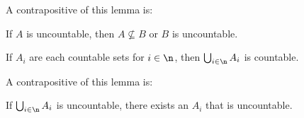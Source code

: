 \begin{remark}
    A contrapositive of this lemma is:
    \begin{displayquote}
        If $A$ is uncountable, then $A\nsubseteq B$ or $B$ is uncountable.
    \end{displayquote}
\end{remark}

\begin{theorem*}{
    If $A_i$ are each countable sets for $i\in\n$, then $\bigcup_{i\in\n} A_i$ is countable.\label{thm:1.5.8}
}
\end{theorem*}

\begin{remark}
    A contrapositive of this lemma is:
    \begin{displayquote}
        If $\bigcup_{i\in\n} A_i$ is uncountable, there exists an $A_i$ that is uncountable.
    \end{displayquote}
\end{remark}
